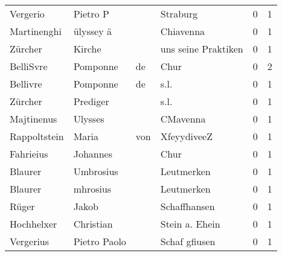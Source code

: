 \begin{center}
\begin{tiny}
\begin{longtabu}{llllrr}
                 Vergerio &                           Pietro P &             &                                    Straburg &          0 &         1 \\
              Martinenghi &                          ülyssey ä &             &                                   Chiavenna &          0 &         1 \\
                  Zürcher &                             Kirche &             &                         uns seine Praktiken &          0 &         1 \\
                BelliSvre &                           Pomponne &          de &                                        Chur &          0 &         2 \\
                 Bellivre &                           Pomponne &          de &                                        s.l. &          0 &         1 \\
                  Zürcher &                           Prediger &             &                                        s.l. &          0 &         1 \\
               Majtinenus &                            Ulysses &             &                                    CMavenna &          0 &         1 \\
             Rappoltstein &                              Maria &         von &                                 XfeyydiveeZ &          0 &         1 \\
                Fahrieius &                           Johannes &             &                                        Chur &          0 &         1 \\
                  Blaurer &                          Umbrosius &             &                                  Leutmerken &          0 &         1 \\
                  Blaurer &                           mhrosius &             &                                  Leutmerken &          0 &         1 \\
                    Rüger &                              Jakob &             &                                Schaffhansen &          0 &         1 \\
               Hochhelxer &                          Christian &             &                              Stein a. Ehein &          0 &         1 \\
                Vergerius &                       Pietro Paolo &             &                               Schaf gfiusen &          0 &         1 \\

\end{longtabu}
\end{tiny}
\end{center}
